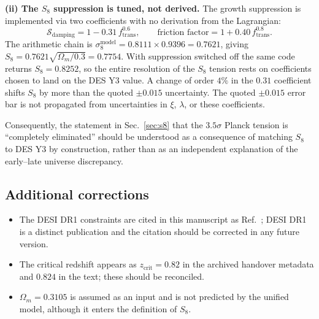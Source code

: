 \documentclass[aps,prd,twocolumn,superscriptaddress,nofootinbib,floatfix,longbibliography]{revtex4-2}
\begin{document}
\textbf{(ii) The $S_8$ suppression is tuned, not derived.} The growth suppression is implemented via two coefficients with no derivation from the Lagrangian:
\begin{equation}
\mathcal{S}_{\text{damping}} = 1 - 0.31\, f_{\text{trans}}^{0.6}, \qquad
\text{friction factor} = 1 + 0.40\, f_{\text{trans}}^{0.8}.
\end{equation}
The arithmetic chain is $\sigma_8^{\text{model}} = 0.8111 \times 0.9396 = 0.7621$, giving $S_8 = 0.7621\sqrt{\Omega_m/0.3} = 0.7754$. With suppression switched off the same code returns $S_8 = 0.8252$, so the entire resolution of the $S_8$ tension rests on coefficients chosen to land on the DES Y3 value. A change of order $4\%$ in the $0.31$ coefficient shifts $S_8$ by more than the quoted $\pm 0.015$ uncertainty. The quoted $\pm 0.015$ error bar is not propagated from uncertainties in $\xi$, $\lambda$, or these coefficients.

Consequently, the statement in Sec.~\ref{sec:s8} that the $3.5\sigma$ Planck tension is ``completely eliminated'' should be understood as a consequence of matching $S_8$ to DES Y3 by construction, rather than as an independent explanation of the early--late universe discrepancy.

\subsection{Additional corrections}
\begin{itemize}
\item The DESI DR1 constraints are cited in this manuscript as Ref.~\cite{Planck2020}; DESI DR1 is a distinct publication and the citation should be corrected in any future version.
\item The critical redshift appears as $z_{\text{crit}} = 0.82$ in the archived handover metadata and $0.824$ in the text; these should be reconciled.
\item $\Omega_m = 0.3105$ is assumed as an input and is not predicted by the unified model, although it enters the definition of $S_8$.
\end{itemize}
\end{document}
